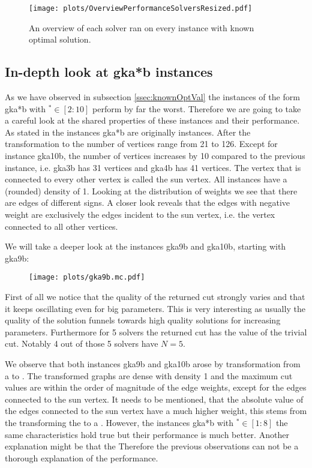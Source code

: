 \documentclass[12pt,a4paper]{article}
\theoremstyle{mythm}
\begin{document}
\begin{figure}[H]
\caption{An overview of each solver ran on every instance with known optimal solution.}
\texttt{[image: plots/OverviewPerformanceSolversResized.pdf]}
\end{figure} 
\subsection{In-depth look at gka*b instances} 
\label{ssec:gkaib} 
As we have observed in subsection \ref{ssec:knownOptVal} the instances of the form gka*b with $ ^{ * } \in \left[ 2:10 \right]  $ perform by far the worst.
Therefore we are going to take a careful look at the shared properties of these instances and their performance.
As stated in \cite{MallachLibrary} the instances gka*b are originally \BQP instances.
After the transformation to \MCP the number of vertices range from 21 to 126.
Except for instance gka10b, the number of vertices increases by 10 compared to the previous instance, i.e. gka3b has 31 vertices and gka4b has 41 vertices.
The vertex that is connected to every other vertex is called the sun vertex.
All instances have a (rounded) density of 1.
Looking at the distribution of weights we see that there are edges of different signs.
A closer look reveals that the edges with negative weight are exclusively the edges incident to the sun vertex, i.e. the vertex connected to all other vertices.

We will take a deeper look at the instances gka9b and gka10b, starting with gka9b:
\begin{figure}[H]
\texttt{[image: plots/gka9b.mc.pdf]}
\end{figure} 
First of all we notice that the quality of the returned cut strongly varies and that it keeps oscillating even for big parameters.
This is very interesting as usually the quality of the solution funnels towards high quality solutions for increasing parameters.
Furthermore for 5 solvers the returned cut has the value of the trivial cut.
Notably 4 out of those 5 solvers have $ N = 5 $.

We observe that both instances gka9b and gka10b arose by transformation from a \BQP to \MCP.
The transformed graphs are dense with density 1 and the maximum cut values are within the order of magnitude of the edge weights, except for the edges connected to the sun
vertex.
It needs to be mentioned, that the absolute value of the edges connected to the sun vertex have a much higher weight, this stems from the transforming the \BQP to a \MCP.
However, the instances gka*b with $ ^{ * }  \in \left[ 1:8 \right]  $ the same characteristics hold true but their performance is much better.
Another explanation might be that the 
Therefore the previous observations can not be a thorough explanation of the performance.
\end{document}
